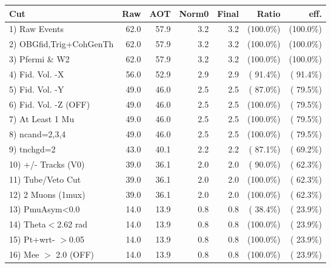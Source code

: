 \begin{table}[h!]\centering
 \begin{tabular}{||l||r|r|r|r|r|r||}
 \hline
 \hline
 Cut & Raw & AOT & Norm0 & Final & Ratio & eff.       \\
 \hline
  1) Raw Events           &         62.0 &         57.9 &          3.2 &          3.2 & (100.0\%) & (100.0\%) \\
  2) OBGfid,Trig+CohGenTh &         62.0 &         57.9 &          3.2 &          3.2 & (100.0\%) & (100.0\%) \\
  3) Pfermi \& W2         &         62.0 &         57.9 &          3.2 &          3.2 & (100.0\%) & (100.0\%) \\
  4) Fid. Vol. -X         &         56.0 &         52.9 &          2.9 &          2.9 & ( 91.4\%) & ( 91.4\%) \\
  5) Fid. Vol. -Y         &         49.0 &         46.0 &          2.5 &          2.5 & ( 87.0\%) & ( 79.5\%) \\
  6) Fid. Vol. -Z (OFF)   &         49.0 &         46.0 &          2.5 &          2.5 & (100.0\%) & ( 79.5\%) \\
  7) At Least 1 Mu        &         49.0 &         46.0 &          2.5 &          2.5 & (100.0\%) & ( 79.5\%) \\
  8) ncand=2,3,4          &         49.0 &         46.0 &          2.5 &          2.5 & (100.0\%) & ( 79.5\%) \\
  9) tnchgd=2             &         43.0 &         40.1 &          2.2 &          2.2 & ( 87.1\%) & ( 69.2\%) \\
 10) +/- Tracks (V0)      &         39.0 &         36.1 &          2.0 &          2.0 & ( 90.0\%) & ( 62.3\%) \\
 11) Tube/Veto Cut        &         39.0 &         36.1 &          2.0 &          2.0 & (100.0\%) & ( 62.3\%) \\
 12) 2 Muons (1mux)       &         39.0 &         36.1 &          2.0 &          2.0 & (100.0\%) & ( 62.3\%) \\
 13) PmuAsym<0.0          &         14.0 &         13.9 &          0.8 &          0.8 & ( 38.4\%) & ( 23.9\%) \\
 14) Theta$<$2.62 rad     &         14.0 &         13.9 &          0.8 &          0.8 & (100.0\%) & ( 23.9\%) \\
 15) Pt+wrt- $>$0.05      &         14.0 &         13.9 &          0.8 &          0.8 & (100.0\%) & ( 23.9\%) \\
 16) Mee $>$ 2.0  (OFF)   &         14.0 &         13.9 &          0.8 &          0.8 & (100.0\%) & ( 23.9\%) \\

\end{tabular}
\end{table}
